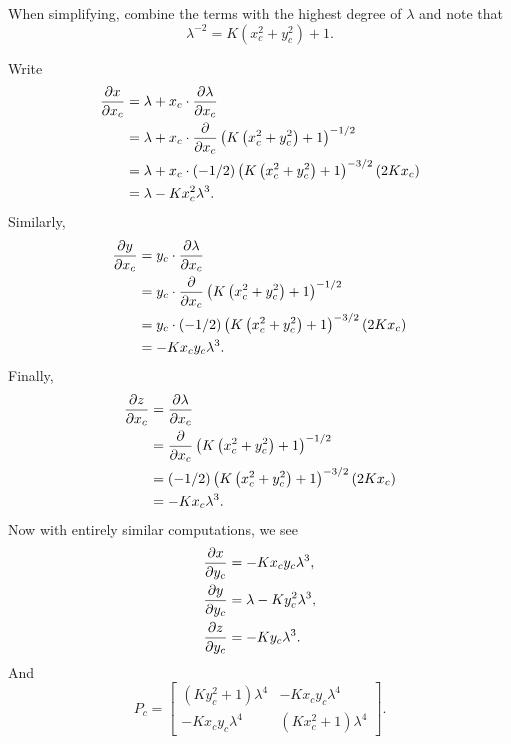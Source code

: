 \documentclass[newpage,hints,handout,12pt,noauthor,nooutcomes]{ximera}
\begin{document}
\begin{problem}
\begin{hint}
  When simplifying, combine the terms with the highest degree of $\lambda$
  and note that
  \[
  \lambda^{-2} = K\left(x_c^2 + y_c^2\right) + 1.
  \]
\end{hint}


\begin{freeResponse}
    Write
  \begin{align*}
    \pp[x]{x_c} &= \lambda  + x_c \cdot \pp[\lambda]{x_c}\\
    &= \lambda + x_c \cdot \pp{x_c} \left(K\left(x_c^2 + y_c^2\right)+1\right)^{-1/2}\\
    &= \lambda + x_c \cdot (-1/2)\left(K\left(x_c^2 + y_c^2\right)+1\right)^{-3/2}(2Kx_c)\\
    &= \lambda -Kx_c^2 \lambda^3.
  \end{align*}
  Similarly,
    \begin{align*}
    \pp[y]{x_c} &= y_c \cdot \pp[\lambda]{x_c}\\
    &= y_c \cdot \pp{x_c} \left(K\left(x_c^2 + y_c^2\right)+1\right)^{-1/2}\\
    &= y_c \cdot (-1/2)\left(K\left(x_c^2 + y_c^2\right)+1\right)^{-3/2}(2Kx_c)\\
    &= -Kx_cy_c \lambda^3.
    \end{align*}
   Finally, 
    \begin{align*}
    \pp[z]{x_c} &= \pp[\lambda]{x_c}\\
    &= \pp{x_c}\left(K\left(x_c^2 + y_c^2\right)+1\right)^{-1/2}\\
    &= (-1/2)\left(K\left(x_c^2 + y_c^2\right)+1\right)^{-3/2}(2Kx_c)\\
    &= -Kx_c \lambda^3.
    \end{align*}
    Now with entirely similar computations, we see
    \begin{align*}
      \pp[x]{y_c} &= -Kx_cy_c \lambda^3,\\
      \pp[y]{y_c} &= \lambda - Ky_c^2 \lambda^3,\\
      \pp[z]{y_c} &= -Ky_c \lambda^3.
    \end{align*}
    And
    \[
  P_c =
  \begin{bmatrix}
    \left(Ky_c^2+1\right)\lambda^4 & -Kx_{c}y_{c}\lambda^4\\
    -Kx_{c}y_{c}\lambda^4 & \left(Kx_c^2+1\right)\lambda^4
  \end{bmatrix}.
\]
  

\end{freeResponse}
\end{problem}
\end{document}

